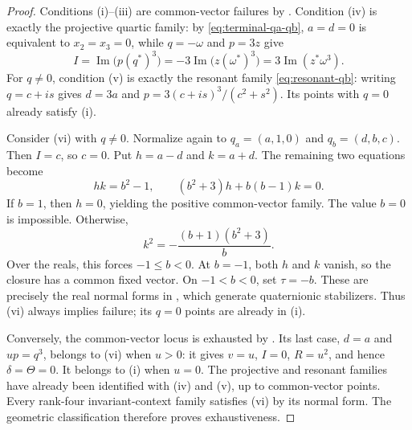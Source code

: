 \documentclass[11pt,a4paper]{article}
\begin{document}
\begin{proof}
Conditions (i)--(iii) are common-vector failures by .  Condition (iv) is exactly the projective quartic family: by \eqref{eq:terminal-qa-qb}, $a=d=0$ is equivalent to $x_2=x_3=0$, while $q=-\omega$ and $p=3z$ give
\[
I=\operatorname{Im}\bigl(p(q^\ast)^3\bigr)
 =-3\operatorname{Im}\bigl(z(\omega^\ast)^3\bigr)
 =3\operatorname{Im}(z^\ast\omega^3).
\]
For $q\ne0$, condition (v) is exactly the resonant family \eqref{eq:resonant-qb}: writing $q=c+is$ gives $d=3a$ and $p=3(c+is)^3/(c^2+s^2)$.  Its points with $q=0$ already satisfy (i).

Consider (vi) with $q\ne0$.  Normalize again to $q_a=(a,1,0)$ and $q_b=(d,b,c)$.  Then $I=c$, so $c=0$.  Put $h=a-d$ and $k=a+d$.  The remaining two equations become
\[
hk=b^2-1,\qquad (b^2+3)h+b(b-1)k=0.
\]
If $b=1$, then $h=0$, yielding the positive common-vector family.  The value $b=0$ is impossible.  Otherwise,
\[
k^2=-\frac{(b+1)(b^2+3)}{b}.
\]
Over the reals, this forces $-1\le b<0$.  At $b=-1$, both $h$ and $k$ vanish, so the closure has a common fixed vector.  On $-1<b<0$, set $\tau=-b$.  These are precisely the real normal forms in , which generate quaternionic stabilizers.  Thus (vi) always implies failure; its $q=0$ points are already in (i).

Conversely, the common-vector locus is exhausted by .  Its last case, $d=a$ and $up=q^3$, belongs to (vi) when $u>0$: it gives $v=u$, $I=0$, $R=u^2$, and hence $\delta=\Theta=0$.  It belongs to (i) when $u=0$.  The projective and resonant families have already been identified with (iv) and (v), up to common-vector points.  Every rank-four invariant-context family satisfies (vi) by its normal form.  The geometric classification  therefore proves exhaustiveness.
\end{proof}
\end{document}
